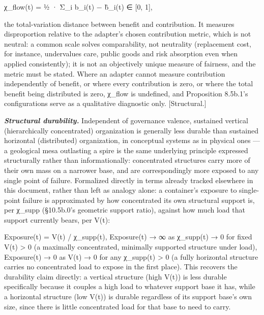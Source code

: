 \documentclass[
]{article}
\begin{document}
χ\_flow(t) = ½ · Σ\_i \textbar{} b\_i(t) − b̂\_i(t) \textbar{} ∈ {[}0,
1{]},

the total-variation distance between benefit and contribution. It
measures disproportion relative to the adapter's chosen contribution
metric, which is not neutral: a common scale solves comparability, not
neutrality (replacement cost, for instance, undervalues care, public
goods and risk absorption even when applied consistently); it is not an
objectively unique measure of fairness, and the metric must be stated.
Where an adapter cannot measure contribution independently of benefit,
or where every contribution is zero, or where the total benefit being
distributed is zero, χ\_flow is undefined, and Proposition 8.5b.1's
configurations serve as a qualitative diagnostic only. {[}Structural.{]}

\emph{\textbf{Structural durability.}} Independent of governance
valence, sustained vertical (hierarchically concentrated) organization
is generally less durable than sustained horizontal (distributed)
organization, in conceptual systems as in physical ones --- a geological
mesa outlasting a spire is the same underlying principle expressed
structurally rather than informationally: concentrated structures carry
more of their own mass on a narrower base, and are correspondingly more
exposed to any single point of failure. Formalized directly in terms
already tracked elsewhere in this document, rather than left as analogy
alone: a container's exposure to single-point failure is approximated by
how concentrated its own structural support is, per χ\_supp (§10.5b.0's
geometric support ratio), against how much load that support currently
bears, per V(t):

Exposure(t) = V(t) / χ\_supp(t), Exposure(t) → ∞ as χ\_supp(t) → 0 for
fixed V(t) \textgreater{} 0 (a maximally concentrated, minimally
supported structure under load), Exposure(t) → 0 as V(t) → 0 for any
χ\_supp(t) \textgreater{} 0 (a fully horizontal structure carries no
concentrated load to expose in the first place). This recovers the
durability claim directly: a vertical structure (high V(t)) is less
durable specifically because it couples a high load to whatever support
base it has, while a horizontal structure (low V(t)) is durable
regardless of its support base's own size, since there is little
concentrated load for that base to need to carry.
\end{document}

